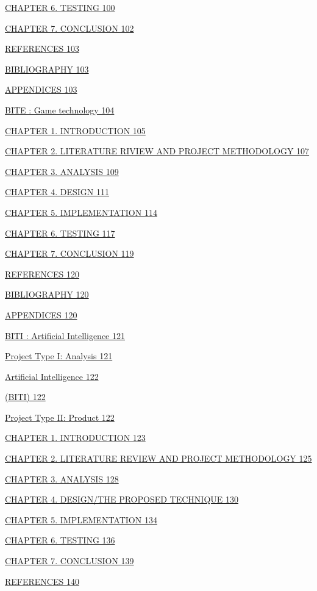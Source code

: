 \hyperref[_bookmark41]{CHAPTER 6. TESTING 100}

\hyperref[_bookmark42]{CHAPTER 7. CONCLUSION 102}

\hyperref[_bookmark43]{REFERENCES 103}

\hyperref[_bookmark44]{BIBLIOGRAPHY 103}

\hyperref[_bookmark45]{APPENDICES 103}

\hyperref[_bookmark46]{BITE : Game technology 104}

\hyperref[_bookmark47]{CHAPTER 1. INTRODUCTION 105}

\hyperref[_bookmark48]{CHAPTER 2. LITERATURE RIVIEW AND PROJECT
METHODOLOGY 107}

\hyperref[_bookmark49]{CHAPTER 3. ANALYSIS 109}

\hyperref[_bookmark50]{CHAPTER 4. DESIGN 111}

\hyperref[_bookmark51]{CHAPTER 5. IMPLEMENTATION 114}

\hyperref[_bookmark52]{CHAPTER 6. TESTING 117}

\hyperref[_bookmark53]{CHAPTER 7. CONCLUSION 119}

\hyperref[_bookmark54]{REFERENCES 120}

\hyperref[_bookmark55]{BIBLIOGRAPHY 120}

\hyperref[_bookmark56]{APPENDICES 120}

\hyperref[_bookmark57]{BITI : Artificial Intelligence 121}

\hyperref[_bookmark58]{Project Type I: Analysis 121}

\hyperref[_bookmark59]{Artificial Intelligence 122}

\hyperref[_bookmark60]{(BITI) 122}

\hyperref[_bookmark61]{Project Type II: Product 122}

\hyperref[_bookmark62]{CHAPTER 1. INTRODUCTION 123}

\hyperref[_bookmark63]{CHAPTER 2. LITERATURE REVIEW AND PROJECT
METHODOLOGY 125}

\hyperref[_bookmark64]{CHAPTER 3. ANALYSIS 128}

\hyperref[_bookmark65]{CHAPTER 4. DESIGN/THE PROPOSED TECHNIQUE 130}

\hyperref[_bookmark66]{CHAPTER 5. IMPLEMENTATION 134}

\hyperref[_bookmark67]{CHAPTER 6. TESTING 136}

\hyperref[_bookmark68]{CHAPTER 7. CONCLUSION 139}

\hyperref[_bookmark69]{REFERENCES 140}

